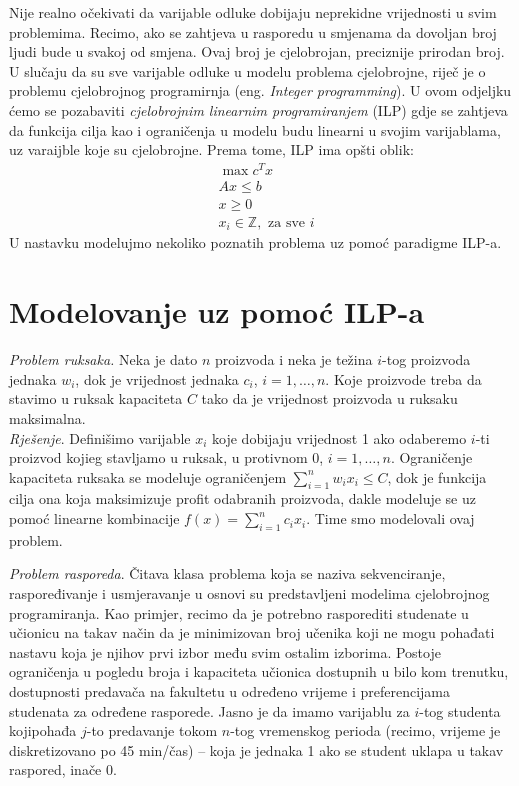 \documentclass[a4paper, utf8, 11pt, colorlinks]{book}
\begin{document}
Nije realno očekivati da varijable odluke dobijaju neprekidne vrijednosti u svim problemima. Recimo, ako se zahtjeva u rasporedu u smjenama da dovoljan broj ljudi bude u svakoj od smjena. Ovaj broj je cjelobrojan, preciznije prirodan broj. U slučaju da su sve varijable odluke u modelu problema cjelobrojne, riječ je o problemu cjelobrojnog programirnja (eng. \emph{Integer programming}). 
U ovom odjeljku ćemo se pozabaviti   \emph{cjelobrojnim linearnim programiranjem} (ILP) gdje se zahtjeva da funkcija cilja kao i ograničenja u modelu budu linearni u svojim varijablama, uz varaijble koje su cjelobrojne. Prema tome, ILP ima opšti oblik:
\begin{align}
    & \max c^T x \nonumber\\
    & A x \leq b \nonumber \\
    & x \geq 0 \nonumber\\
    & x_i \in \mathbb{Z}, \mbox{ za sve } i \label{ilp-formulation}
\end{align}
U nastavku modelujmo nekoliko poznatih problema uz pomoć paradigme ILP-a. 

\section{Modelovanje uz pomoć ILP-a}

\emph{Problem ruksaka.} Neka je dato $n$ proizvoda i neka je težina $i$-tog proizvoda jednaka $w_i$, dok je vrijednost jednaka $c_i$, $i=1,\ldots,n$. Koje proizvode treba da stavimo u ruksak kapaciteta $C$ tako da je vrijednost proizvoda u ruksaku maksimalna. \\
\emph{Rješenje}. Definišimo varijable $x_i$ koje dobijaju vrijednost 1 ako odaberemo $i$-ti proizvod kojieg stavljamo u ruksak, u protivnom 0, $i=1,\ldots,n$. Ograničenje kapaciteta ruksaka se modeluje ograničenjem $\sum_{i=1}^n w_i x_i \leq C$, dok je funkcija cilja ona koja maksimizuje profit odabranih proizvoda, dakle modeluje se uz pomoć linearne kombinacije $f(x) = \sum_{i=1}^n c_i x_i$. Time smo modelovali ovaj problem.

\emph{Problem rasporeda}. Čitava klasa problema koja se naziva sekvenciranje, raspoređivanje i usmjeravanje u osnovi su predstavljeni modelima cjelobrojnog programiranja. Kao primjer, recimo da je potrebno rasporediti studenate u  učionicu na takav način
da je minimizovan broj učenika koji ne mogu pohađati nastavu koja je njihov prvi izbor među svim ostalim izborima. Postoje ograničenja u pogledu broja i kapaciteta učionica dostupnih u bilo kom trenutku, dostupnosti predavača na fakultetu u određeno vrijeme i preferencijama studenata za određene rasporede. Jasno je da imamo varijablu za   $i$-tog studenta 
kojipohađa $j$-to predavanje tokom $n$-tog vremenskog perioda (recimo, vrijeme je diskretizovano po 45 min/čas) -- koja je jednaka 1 ako se student uklapa u takav raspored, inače 0. 
\end{document}
